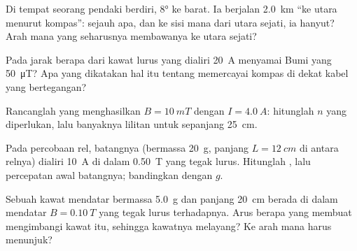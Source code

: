 \begin{exercise}[$\star\star$]\label{exo:g11:magnetic-fields:6}
Di tempat seorang pendaki berdiri,  $\ang{8}$ ke barat. Ia
berjalan \qty{2.0}{km} ``ke utara menurut kompas'': sejauh apa, dan ke
sisi mana dari utara sejati, ia hanyut? Arah mana yang seharusnya
membawanya ke utara sejati?
\end{exercise}

\begin{exercise}[$\star\star$]\label{exo:g11:magnetic-fields:7}
Pada jarak berapa dari kawat lurus yang dialiri \qty{20}{A} 
menyamai  Bumi yang \qty{50}{\micro T}? Apa yang dikatakan hal itu
tentang memercayai kompas di dekat kabel yang bertegangan?
\end{exercise}

\begin{exercise}[$\star\star$]\label{exo:g11:magnetic-fields:8}
Rancanglah  yang menghasilkan $B = \qty{10}{mT}$ dengan
$I = \qty{4.0}{A}$: hitunglah $n$ yang diperlukan, lalu banyaknya
lilitan untuk  sepanjang \qty{25}{cm}.
\end{exercise}

\begin{exercise}[$\star\star$]\label{exo:g11:magnetic-fields:9}
Pada percobaan rel, batangnya (bermassa \qty{20}{g}, panjang
$L = \qty{12}{cm}$ di antara relnya) dialiri \qty{10}{A} di dalam 
\qty{0.50}{T} yang tegak lurus. Hitunglah , lalu
percepatan awal batangnya; bandingkan dengan $g$.
\end{exercise}

\begin{exercise}[$\star\star$]\label{exo:g11:magnetic-fields:10}
Sebuah kawat mendatar bermassa \qty{5.0}{g} dan panjang \qty{20}{cm}
berada di dalam  mendatar $B = \qty{0.10}{T}$ yang tegak lurus
terhadapnya. Arus berapa yang membuat  mengimbangi
 kawat itu, sehingga kawatnya melayang? Ke arah mana  harus
menunjuk?
\end{exercise}

